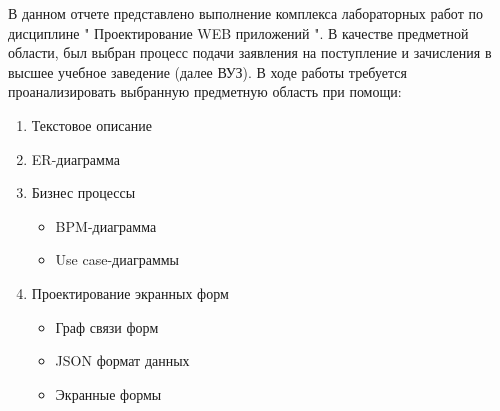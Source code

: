 \documentclass[areasetadvanced]{scrartcl}
\begin{document}
В данном отчете представлено выполнение комплекса лабораторных работ по дисциплине
" Проектирование WEB приложений ". В качестве предметной области, был выбран процесс
подачи заявления на поступление и зачисления в высшее учебное заведение (далее ВУЗ).
В ходе работы требуется проанализировать выбранную предметную область при помощи:
\begin{enumerate}
    \item Текстовое описание
    \item ER-диаграмма
    \item Бизнес процессы \begin{itemize}
      \item BPM-диаграмма
      \item Use case-диаграммы
    \end{itemize}
    \item Проектирование экранных форм \begin{itemize}
      \item Граф связи форм
      \item JSON формат данных 
      \item Экранные формы
    \end{itemize}
\end{enumerate}
\newpage
\end{document}
